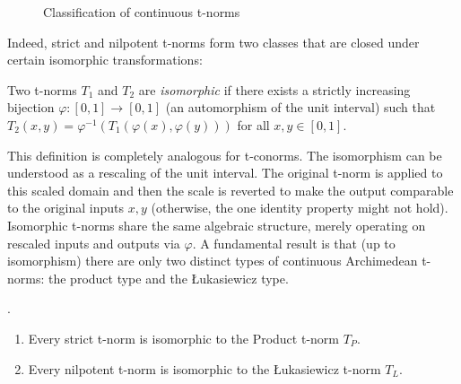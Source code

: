 \begin{figure}[ht]
\centering
{}
\caption{Classification of continuous t-norms}
\label{fig:tnorm_classification}
\end{figure}



Indeed, strict and nilpotent t-norms form two classes that are closed under certain isomorphic transformations: 

\begin{definition}
  Two t-norms $T_1$ and $T_2$ are \emph{isomorphic} if there exists a strictly increasing bijection $\varphi: [0,1] \to [0,1]$ (an automorphism of the unit interval) such that $T_2(x,y) = \varphi^{-1}(T_1(\varphi(x), \varphi(y)))$ for all $x,y \in [0,1]$.
\end{definition}
This definition is completely analogous for t-conorms. The isomorphism can be understood as a rescaling of the unit interval. The original t-norm is applied to this scaled domain and then the scale is reverted to make the output comparable to the original inputs $x,y$ (otherwise, the one identity property might not hold). Isomorphic t-norms share the same algebraic structure, merely operating on rescaled inputs and outputs via $\varphi$. A fundamental result is that (up to isomorphism) there are only two distinct types of continuous Archimedean t-norms: the product type and the Łukasiewicz type.
\begin{proposition}
  {\color{white}.}
  \begin{enumerate} 
      \item Every strict t-norm is isomorphic to the Product t-norm $T_P$.
      \item Every nilpotent t-norm is isomorphic to the Łukasiewicz t-norm $T_L$.
  \end{enumerate}
\end{proposition}

